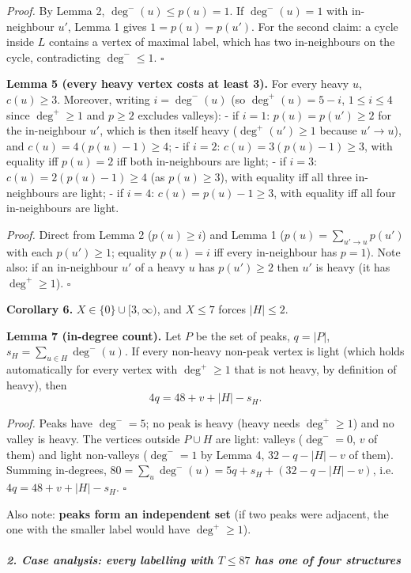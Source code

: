 \documentclass[11pt,a4paper]{article}
\begin{document}
\emph{Proof.} By Lemma 2, \(\deg^-(u)\le p(u)=1\). If \(\deg^-(u)=1\)
with in-neighbour \(u'\), Lemma 1 gives \(1=p(u)=p(u')\). For the second
claim: a cycle inside \(L\) contains a vertex of maximal label, which
has two in-neighbours on the cycle, contradicting \(\deg^-\le1\).
\(\square\)

\textbf{Lemma 5 (every heavy vertex costs at least 3).} For every heavy
\(u\), \(c(u)\ge3\). Moreover, writing \(i=\deg^-(u)\) (so
\(\deg^+(u)=5-i\), \(1\le i\le4\) since \(\deg^+\ge1\) and \(p\ge2\)
excludes valleys): - if \(i=1\): \(p(u)=p(u')\ge2\) for the in-neighbour
\(u'\), which is then itself heavy (\(\deg^+(u')\ge1\) because
\(u'\to u\)), and \(c(u)=4(p(u)-1)\ge4\); - if \(i=2\):
\(c(u)=3(p(u)-1)\ge3\), with equality iff \(p(u)=2\) iff both
in-neighbours are light; - if \(i=3\): \(c(u)=2(p(u)-1)\ge4\) (as
\(p(u)\ge3\)), with equality iff all three in-neighbours are light; - if
\(i=4\): \(c(u)=p(u)-1\ge3\), with equality iff all four in-neighbours
are light.

\emph{Proof.} Direct from Lemma 2 (\(p(u)\ge i\)) and Lemma 1
(\(p(u)=\sum_{u'\to u}p(u')\) with each \(p(u')\ge1\); equality
\(p(u)=i\) iff every in-neighbour has \(p=1\)). Note also: if an
in-neighbour \(u'\) of a heavy \(u\) has \(p(u')\ge2\) then \(u'\) is
heavy (it has \(\deg^+\ge1\)). \(\square\)

\textbf{Corollary 6.} \(X\in\{0\}\cup[3,\infty)\), and \(X\le 7\) forces
\(|H|\le2\).

\textbf{Lemma 7 (in-degree count).} Let \(P\) be the set of peaks,
\(q=|P|\), \(s_H=\sum_{u\in H}\deg^-(u)\). If every non-heavy non-peak
vertex is light (which holds automatically for every vertex with
\(\deg^+\ge1\) that is not heavy, by definition of heavy), then
\[4q=48+v+|H|-s_H .\]

\emph{Proof.} Peaks have \(\deg^-=5\); no peak is heavy (heavy needs
\(\deg^+\ge1\)) and no valley is heavy. The vertices outside \(P\cup H\)
are light: valleys (\(\deg^-=0\), \(v\) of them) and light non-valleys
(\(\deg^-=1\) by Lemma 4, \(32-q-|H|-v\) of them). Summing in-degrees,
\(80=\sum_u\deg^-(u)=5q+s_H+(32-q-|H|-v)\), i.e.~\(4q=48+v+|H|-s_H\).
\(\square\)

Also note: \textbf{peaks form an independent set} (if two peaks were
adjacent, the one with the smaller label would have \(\deg^+\ge1\)).

\subparagraph{\texorpdfstring{2. Case analysis: every labelling with
\(T\le87\) has one of four
structures}{2. Case analysis: every labelling with T\textbackslash le87 has one of four structures}}\label{case-analysis-every-labelling-with-tle87-has-one-of-four-structures}
\end{document}
